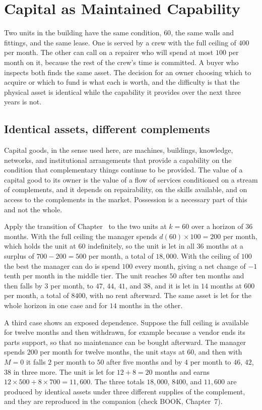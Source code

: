 \chapter{Capital as Maintained Capability}\label{ch:7}

Two units in the building have the same condition, $60$, the same walls and fittings, and the same lease. One is served by a crew with the full ceiling of $400$ per month. The other can call on a repairer who will spend at most $100$ per month on it, because the rest of the crew's time is committed. A buyer who inspects both finds the same asset. The decision for an owner choosing which to acquire or which to fund is what each is worth, and the difficulty is that the physical asset is identical while the capability it provides over the next three years is not.

\section{Identical assets, different complements}

Capital goods, in the sense used here, are machines, buildings, knowledge, networks, and institutional arrangements that provide a capability on the condition that complementary things continue to be provided. The value of a capital good to its owner is the value of a flow of services conditioned on a stream of complements, and it depends on repairability, on the skills available, and on access to the complements in the market. Possession is a necessary part of this and not the whole.

Apply the transition of Chapter~ to the two units at $k=60$ over a horizon of $36$ months. With the full ceiling the manager spends $d(60)\times 100=200$ per month, which holds the unit at $60$ indefinitely, so the unit is let in all $36$ months at a surplus of $700-200=500$ per month, a total of $18{,}000$. With the ceiling of $100$ the best the manager can do is spend $100$ every month, giving a net change of $-1$ tenth per month in the middle tier. The unit reaches $50$ after ten months and then falls by $3$ per month, to $47$, $44$, $41$, and $38$, and it is let in $14$ months at $600$ per month, a total of $8400$, with no rent afterward. The same asset is let for the whole horizon in one case and for $14$ months in the other.

A third case shows an exposed dependence. Suppose the full ceiling is available for twelve months and then withdrawn, for example because a vendor ends its parts support, so that no maintenance can be bought afterward. The manager spends $200$ per month for twelve months, the unit stays at $60$, and then with $M=0$ it falls $2$ per month to $50$ after five months and by $4$ per month to $46$, $42$, $38$ in three more. The unit is let for $12+8=20$ months and earns $12\times 500+8\times 700=11{,}600$. The three totals $18{,}000$, $8400$, and $11{,}600$ are produced by identical assets under three different supplies of the complement, and they are reproduced in the companion (check BOOK, Chapter~7).

